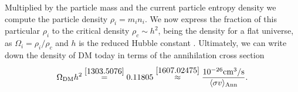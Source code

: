 Multiplied by the particle mass and the current particle entropy density we compute the particle density $\rho_i=m_in_i$. 
We now express the fraction of this particular $\rho_i$ to the 
critical density $\rho_c \sim h^2$, being the density for a flat universe, as $\Omega_i = \rho_i / \rho_c$ and $h$ is the reduced Hubble constant 
\cite{1308.4150}. Ultimately, we can write down the density of DM today in terms of the annihilation cross section %
\begin{align}
 \Omega_\text{DM} h^2 \stackrel{\cite{1303.5076}}{=} 0.11805 \stackrel{\cite{1607.02475}}{\approx} \frac{10^{-26} \text{cm}^3 / \text{s}}{ \langle \sigma v \rangle_\text{Ann}}.
 \label{eq_boundAnn}
\end{align}